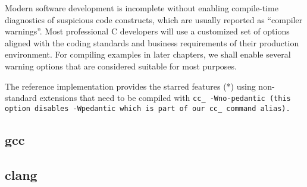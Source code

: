 \def\Subsection#1{\subsection{#1}}

Modern software development is incomplete without enabling
compile-time diagnostics of suspicious code constructs,
which are usually reported as ``compiler warnings''.
Most professional C developers will use a customized set of options aligned with
the coding standards and business requirements of their production environment.
For compiling examples in later chapters, we shall enable several
warning options that are considered suitable for most purposes.

\note The reference implementation provides the starred features (*) using non-%
standard extensions that need to be compiled with \tt{cc_ -Wno-pedantic} (this
option disables \tt{-Wpedantic} which is part of our \tt{cc_} command alias).

\Subsection{gcc}

\Subsection{clang}
